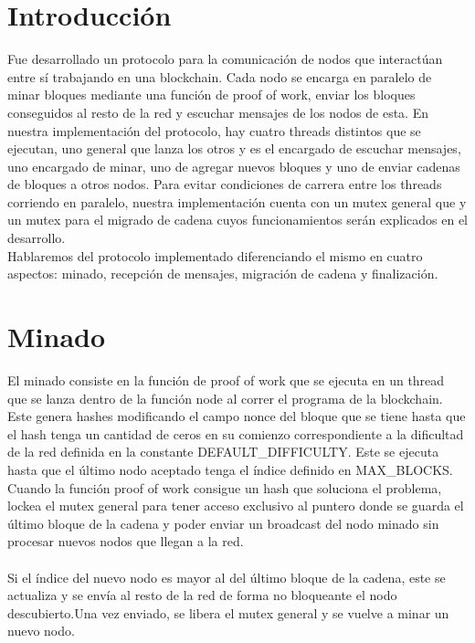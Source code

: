 \section{Introducción}

Fue desarrollado un protocolo para la comunicación de nodos que interactúan entre sí trabajando en una blockchain. Cada nodo se encarga en paralelo de minar bloques mediante una función de proof of work, enviar los bloques conseguidos al resto de la red y escuchar mensajes de los nodos de esta. En nuestra implementación del protocolo, hay cuatro threads distintos que se ejecutan, uno general que lanza los otros y es el encargado de escuchar mensajes, uno encargado de minar, uno de agregar nuevos bloques y uno de enviar cadenas de bloques a otros nodos. Para evitar condiciones de carrera entre los threads corriendo en paralelo, nuestra implementación cuenta con un mutex general que y un mutex para el migrado de cadena cuyos funcionamientos serán explicados en el desarrollo.
\\
Hablaremos del protocolo implementado diferenciando el mismo en cuatro aspectos: minado, recepción de mensajes, migración de cadena y finalización.

\section{Minado}


El minado consiste en la función de proof of work que se ejecuta en un thread que se lanza dentro de la función node al correr el programa de la blockchain. Este genera hashes modificando el campo nonce del bloque que se tiene hasta que el hash tenga un cantidad de ceros en su comienzo correspondiente a la dificultad de la red definida en la constante DEFAULT_DIFFICULTY. Este se ejecuta hasta que el último nodo aceptado tenga el índice definido en MAX_BLOCKS.\\

Cuando la función proof of work consigue un hash que soluciona el problema, lockea el mutex general para tener acceso exclusivo al puntero donde se guarda el último bloque de la cadena y poder enviar un broadcast del nodo minado sin procesar nuevos nodos que llegan a la red.\\
\\
Si el índice del nuevo nodo es mayor al del último bloque de la cadena, este se actualiza y se envía al resto de la red de forma no bloqueante el nodo descubierto.Una vez enviado, se libera el mutex general y se vuelve a minar un nuevo nodo.
\\

